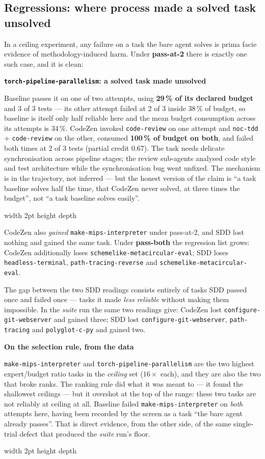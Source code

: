 \documentclass[11pt,a4paper]{article}
\newenvironment{finding}[1]
  {\par\medskip\noindent\begin{lrbox}{\findingbox}%
   \begin{minipage}{\dimexpr\linewidth-2\fboxsep-4pt}%
   \vspace{3pt}\textbf{\color{accent}#1}\par\smallskip\small}
  {\vspace{4pt}\end{minipage}\end{lrbox}%
   \noindent\textcolor{accent}{\vrule width 2pt height \dimexpr\ht\findingbox\relax depth \dimexpr\dp\findingbox\relax}%
   \colorbox{shade}{\usebox{\findingbox}}\par\medskip}
\newcommand{\code}[1]{\texttt{\small #1}}
\newcommand{\task}[1]{\texttt{\footnotesize #1}}
\begin{document}
\subsection{Regressions: where process made a solved task unsolved}
\label{sec:regressions}

In a ceiling experiment, any failure on a task the bare agent solves is prima facie evidence
of methodology-induced harm. Under \textbf{pass-at-2} there is exactly one such case, and it
is clean:

\begin{finding}{\task{torch-pipeline-parallelism}: a solved task made unsolved}
Baseline passes it on one of two attempts, using \textbf{29\,\% of its declared budget}
and 3 of 3 tests --- its other attempt failed at 2 of 3 inside 38\,\% of budget, so baseline is
itself only half reliable here and the mean budget consumption across its attempts is 34\,\%.
CodeZen invoked \code{code-review} on one attempt and \code{noc-tdd} + \code{code-review} on
the other, consumed \textbf{100\,\% of budget on both}, and failed both times at 2 of 3 tests
(partial credit 0.67). The task needs delicate synchronisation across pipeline stages; the
review sub-agents analysed code style and test architecture while the synchronisation bug went
unfixed. The mechanism is in the trajectory, not inferred --- but the honest version of the
claim is ``a task baseline solves half the time, that CodeZen never solved, at three times the
budget'', not ``a task baseline solves easily''.
\end{finding}

\noindent CodeZen also \emph{gained} \task{make-mips-interpreter} under pass-at-2, and SDD
lost nothing and gained the same task. Under \textbf{pass-both} the regression list grows:
CodeZen additionally loses \task{schemelike-metacircular-eval}; SDD loses
\task{headless-terminal}, \task{path-tracing-reverse} and \task{schemelike-metacircular-eval}.

The gap between the two SDD readings consists entirely of tasks SDD passed once and failed
once --- tasks it made \emph{less reliable} without making them impossible. In the
\emph{suite} run the same two readings give: CodeZen lost \task{configure-git-webserver} and
gained three; SDD lost \task{configure-git-webserver}, \task{path-tracing} and
\task{polyglot-c-py} and gained two.

\begin{finding}{On the selection rule, from the data}
\task{make-mips-interpreter} and \task{torch-pipeline-parallelism} are the two highest
expert/budget ratio tasks in the \emph{ceiling} set ($16\times$ each), and they are also the
two that broke ranks. The ranking rule did what it was meant to --- it found the shallowest
ceilings --- but it overshot at the top of the range: these two tasks are not reliably at
ceiling at all. Baseline failed \task{make-mips-interpreter} on \emph{both} attempts here,
having been recorded by the screen as a task ``the bare agent already passes''. That is
direct evidence, from the other side, of the same single-trial defect that produced the
\emph{suite} run's floor.
\end{finding}
\end{document}
